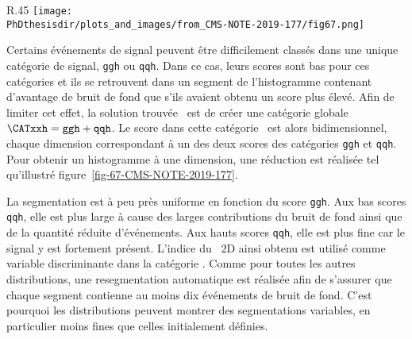 \begin{wrapfigure}{R}{.45\textwidth}
\centering
\texttt{[image: \\PhDthesisdir/plots\_and\_images/from\_CMS-NOTE-2019-177/fig67.png]}
\caption[Réduction à une dimension de la catégorie \CATxxh.]{Réduction à une dimension de la catégorie \CATxxh~\cite{CMS-NOTE-2019-177}.}
\label{fig-67-CMS-NOTE-2019-177}
\end{wrapfigure}
\par
Certains événements de signal peuvent être difficilement classés dans une unique catégorie de signal, \texttt{ggh} ou \texttt{qqh}.
Dans ce cas, leurs scores sont bas pour ces catégories et ils
se retrouvent dans un segment de l'histogramme contenant d'avantage de bruit de fond
que s'ils avaient obtenu un score plus élevé.
Afin de limiter cet effet,
la solution trouvée~\cite{CMS-NOTE-2019-177} est de créer une catégorie globale $\CATxxh=\texttt{ggh} + \texttt{qqh}$.
Le score dans cette catégorie \CATxxh\ est alors bidimensionnel, chaque dimension correspondant à un des deux scores des catégories \texttt{ggh} et \texttt{qqh}.
Pour obtenir un histogramme à une dimension, une réduction est réalisée tel qu'illustré figure~\ref{fig-67-CMS-NOTE-2019-177}.
\par
La segmentation est à peu près uniforme en fonction du score \texttt{ggh}.
Aux bas scores \texttt{qqh}, elle est plus large à cause des larges contributions du bruit de fond ainsi que de la quantité réduite d'événements.
Aux hauts scores \texttt{qqh}, elle est plus fine car le signal y est fortement présent.
L'indice du \NNscore\ 2D ainsi obtenu est utilisé comme variable discriminante dans la catégorie \CATxxh.
Comme pour toutes les autres distributions, une resegmentation automatique est réalisée afin de s'assurer que chaque segment contienne au moins dix événements de bruit de fond.
C'est pourquoi les distributions peuvent montrer des segmentations variables, en particulier moins fines que celles initialement définies.
